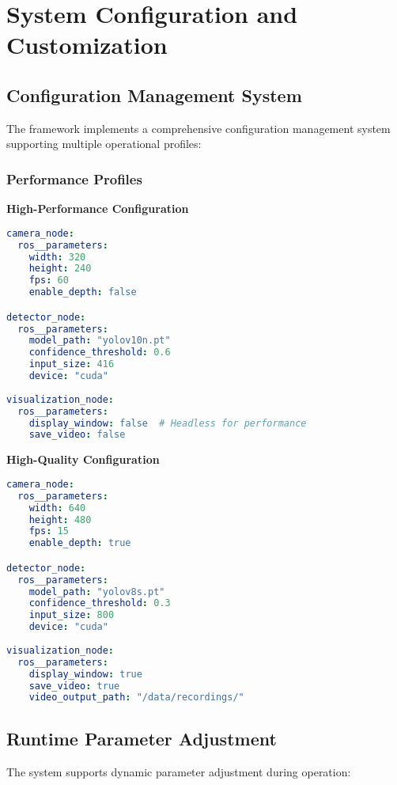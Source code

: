 \documentclass[11pt,a4paper]{article}
\begin{document}
\section{System Configuration and Customization}

\subsection{Configuration Management System}

The framework implements a comprehensive configuration management system supporting multiple operational profiles:

\subsubsection{Performance Profiles}

\textbf{High-Performance Configuration}
\begin{lstlisting}[language=yaml, caption=High-Performance Profile]
camera_node:
  ros__parameters:
    width: 320
    height: 240
    fps: 60
    enable_depth: false

detector_node:
  ros__parameters:
    model_path: "yolov10n.pt"
    confidence_threshold: 0.6
    input_size: 416
    device: "cuda"
    
visualization_node:
  ros__parameters:
    display_window: false  # Headless for performance
    save_video: false
\end{lstlisting}

\textbf{High-Quality Configuration}
\begin{lstlisting}[language=yaml, caption=High-Quality Profile]
camera_node:
  ros__parameters:
    width: 640
    height: 480
    fps: 15
    enable_depth: true

detector_node:
  ros__parameters:
    model_path: "yolov8s.pt"
    confidence_threshold: 0.3
    input_size: 800
    device: "cuda"
    
visualization_node:
  ros__parameters:
    display_window: true
    save_video: true
    video_output_path: "/data/recordings/"
\end{lstlisting}

\subsection{Runtime Parameter Adjustment}

The system supports dynamic parameter adjustment during operation:
\end{document}
